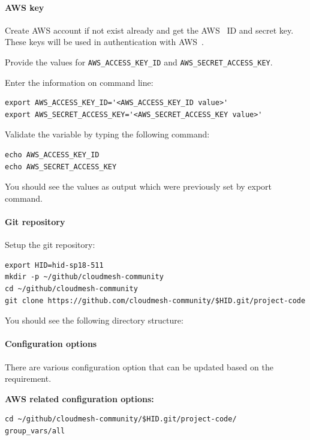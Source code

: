 \paragraph{AWS key}

Create AWS account if not exist already and get the AWS~\cite{hid-sp18-511-www-aws} ID and secret
key. These keys will be used in authentication with AWS~\cite{hid-sp18-511-www-aws}.

Provide the values for \verb|AWS_ACCESS_KEY_ID|
and \verb|AWS_SECRET_ACCESS_KEY|. 

Enter the information on command line:

\begin{verbatim}
export AWS_ACCESS_KEY_ID='<AWS_ACCESS_KEY_ID value>'
export AWS_SECRET_ACCESS_KEY='<AWS_SECRET_ACCESS_KEY value>'
\end{verbatim}

Validate the variable by typing the following command:
\begin{verbatim}
echo AWS_ACCESS_KEY_ID
echo AWS_SECRET_ACCESS_KEY
\end{verbatim}

You should see the values as output which were previously set by export command.

\paragraph{Git repository}

Setup the git repository:

\begin{verbatim}
export HID=hid-sp18-511
mkdir -p ~/github/cloudmesh-community
cd ~/github/cloudmesh-community
git clone https://github.com/cloudmesh-community/$HID.git/project-code
\end{verbatim}

You should see the following directory structure:

\paragraph{Configuration options}

There are various configuration option that can be updated based on
the requirement.

\textbf{AWS related configuration options:}

\begin{verbatim}
cd ~/github/cloudmesh-community/$HID.git/project-code/
group_vars/all
\end{verbatim}

